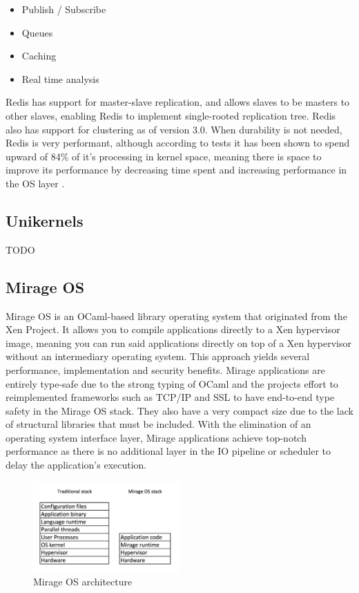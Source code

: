 \documentclass[english,10pt,twocolumn]{article}
\begin{document}
\begin{itemize}
  \item Publish / Subscribe
  \item Queues
  \item Caching
  \item Real time analysis
\end{itemize}

Redis has support for master-slave replication, and allows slaves to be masters to other slaves, enabling Redis to implement single-rooted replication tree.
Redis also has support for clustering as of version 3.0.
When durability is not needed, Redis is very performant, although according to tests it has been shown to spend upward of 84\% of it's processing in kernel space, meaning there is space to improve its performance by decreasing time spent and increasing performance in the OS layer \cite{latency}.

\subsection{Unikernels}

TODO

\subsection{Mirage OS}

Mirage OS is an OCaml-based library operating system that originated from the Xen Project. It allows you to compile applications directly to a Xen hypervisor image, meaning you can run said applications directly on top of a Xen hypervisor without an intermediary operating system.
This approach yields several performance, implementation and security benefits.
Mirage applications are entirely type-safe due to the strong typing of OCaml and the projects effort to reimplemented frameworks such as TCP/IP and SSL to have end-to-end type safety in the Mirage OS stack. They also have a very compact size due to the lack of structural libraries that must be included.
With the elimination of an operating system interface layer, Mirage applications achieve top-notch performance as there is no additional layer in the IO pipeline or scheduler to delay the application's execution.

\begin{figure}[ht]
  \centering
  \caption{Mirage OS architecture}
  \includegraphics[width=0.5\textwidth]{images/design}
\end{figure}
\end{document}
